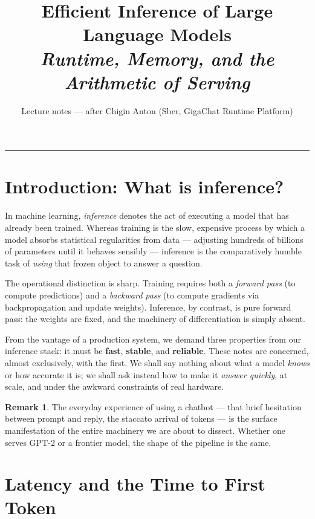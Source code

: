 \documentclass[11pt,a4paper]{article}
\title{\Huge \textbf{Efficient Inference of Large Language Models} \\[0.3em]
       \Large \textit{Runtime, Memory, and the Arithmetic of Serving}}
\author{Lecture notes --- after Chigin Anton (Sber, GigaChat Runtime Platform)}
\date{}
\theoremstyle{definition}
\newtheorem{remark}[definition]{Remark}
\theoremstyle{plain}
\begin{document}
\maketitle


\tableofcontents
\bigskip\hrule\bigskip

\section{Introduction: What is inference?}


In machine learning, \emph{inference} denotes the act of executing a model that has already been trained. Whereas training is the slow, expensive process by which a model absorbs statistical regularities from data --- adjusting hundreds of billions of parameters until it behaves sensibly --- inference is the comparatively humble task of \emph{using} that frozen object to answer a question.

The operational distinction is sharp. Training requires both a \emph{forward pass} (to compute predictions) and a \emph{backward pass} (to compute gradients via backpropagation and update weights). Inference, by contrast, is pure forward pass: the weights are fixed, and the machinery of differentiation is simply absent.

From the vantage of a production system, we demand three properties from our inference stack: it must be \textbf{fast}, \textbf{stable}, and \textbf{reliable}. These notes are concerned, almost exclusively, with the first. We shall say nothing about what a model \emph{knows} or how accurate it is; we shall ask instead how to make it \emph{answer quickly}, at scale, and under the awkward constraints of real hardware.

\begin{remark}
The everyday experience of using a chatbot --- that brief hesitation between prompt and reply, the staccato arrival of tokens --- is the surface manifestation of the entire machinery we are about to dissect. Whether one serves GPT-2 or a frontier model, the shape of the pipeline is the same.
\end{remark}

\section{Latency and the Time to First Token}
\end{document}
